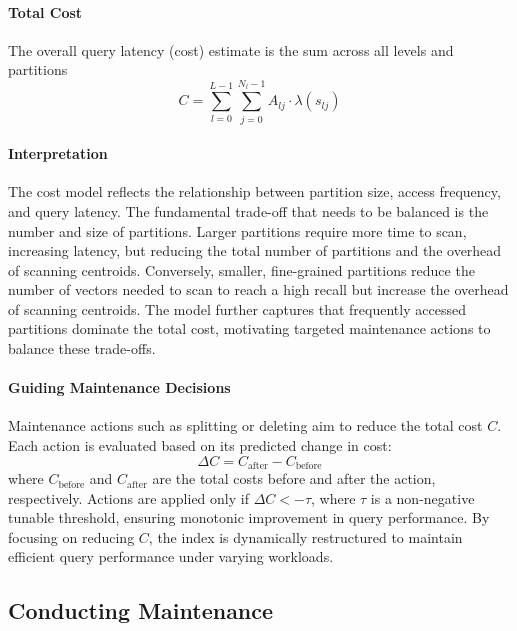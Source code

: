 \paragraph{Total Cost}
The overall query latency (cost) estimate is the sum across all levels and partitions
\begin{equation}
C = \sum_{l=0}^{L-1} \sum_{j=0}^{N_l-1} A_{lj} \cdot \lambda(s_{lj})
\label{eq:CostTotal}
\end{equation}

\paragraph{Interpretation} The cost model reflects the relationship between partition size, access frequency, and query latency. The fundamental trade-off that needs to be balanced is the number and size of partitions. Larger partitions require more time to scan, increasing latency, but reducing the total number of partitions and the overhead of scanning centroids. Conversely, smaller, fine-grained partitions reduce the number of vectors needed to scan to reach a high recall but increase the overhead of scanning centroids. The model further captures that frequently accessed partitions dominate the total cost, motivating targeted maintenance actions to balance these trade-offs.

\paragraph{Guiding Maintenance Decisions} Maintenance actions such as splitting or deleting aim to reduce the total cost \(C\). Each action is evaluated based on its predicted change in cost:
\begin{equation}
\Delta C = C_{\text{after}} - C_{\text{before}}
\label{eq:DeltaC}
\end{equation}
where \(C_{\text{before}}\) and \(C_{\text{after}}\) are the total costs before and after the action, respectively. Actions are applied only if \(\Delta C < -\tau\), where $\tau$ is a non-negative tunable threshold, ensuring monotonic improvement in query performance. By focusing on reducing \(C\), the index is dynamically restructured to maintain efficient query performance under varying workloads.

\subsection{Conducting Maintenance}
\label{sec:maintenance_actions}


